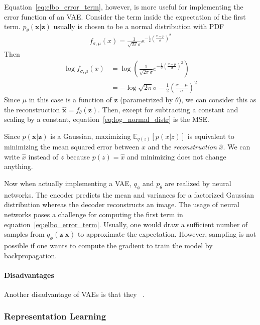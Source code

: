 Equation~\ref{eq:elbo_error_term}, however, is more useful for implementing the error function of an \ac{VAE}.
Consider the term inside the expectation of the first term.
$p_\theta(\bm{x}|\bm{z})$ usually is chosen to be a normal distribution with \ac{PDF}
\begin{align}
    f_{\sigma,\mu}(x) = \frac{1}{\sqrt{2\pi}\sigma}e^{-\frac{1}{2}\left( \frac{x-\mu}{\sigma} \right)^2}
\end{align}
Then
\begin{align}
    \log f_{\sigma,\mu}(x) &= \log \left( \frac{1}{\sqrt{2\pi}\sigma}e^{-\frac{1}{2}\left( \frac{x-\mu}{\sigma} \right)^2} \right)\\
    &= - \log \sqrt{2\pi}\sigma -\frac{1}{2}\left( \frac{x-\mu}{\sigma} \right)^2 \label{eq:log_normal_distr}
\end{align}
Since $\mu$ in this case is a function of $\bm{z}$ (parametrized by $\theta$), we can consider this as the reconstruction $\hat{\bm{x}} = f_\theta(\bm{z})$.
Then, except for subtracting a constant and scaling by a constant, equation~\ref{eq:log_normal_distr} is the \ac{MSE}.

Since $p(\bm{x}|\bm{z})$ is a Gaussian, maximizing $\mathbb{E}_{q(z)} \left[ p(x|z) \right]$ is equivalent to minimizing the mean squared error between $x$ and the \textit{reconstruction} $\hat{x}$.
We can write $\hat{x}$ instead of $z$ because $p(z) = \hat{x}$ and minimizing does not change anything.

Now when actually implementing a \ac{VAE}, $q_\phi$ and $p_\theta$ are realized by neural networks.
The encoder predicts the mean and variances for a factorized Gaussian distribution whereas the decoder reconstructs an image.
The usage of neural networks poses a challenge for computing the first term in equation~\ref{eq:elbo_error_term}.
Usually, one would draw a sufficient number of samples from $q_\phi(\bm{z}|\bm{x})$ to approximate the expectation.
However, sampling is not possible if one wants to compute the gradient to train the model by backpropagation.

\paragraph{Disadvantages}
Another disadvantage of \acp{VAE} is that they ~\citep[p. 694]{Goodfellow-et-al-2016}.

\subsubsection{Representation Learning}

